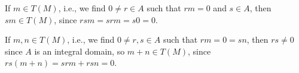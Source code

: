 If $m \in T(M)$, i.e., we find $0\neq r \in A$ such that $rm = 0$ and $s \in A$,
then $sm \in T(M)$, since $rsm = srm = s0 = 0$.

If $m, n \in T(M)$, i.e., we find $0\neq r, s \in A$ such that $rm  = 0 = sn$,
then $rs\neq 0$ since $A$ is an integral domain, so $m+n \in T(M)$, since
$rs(m + n) = srm + rsn = 0$.
